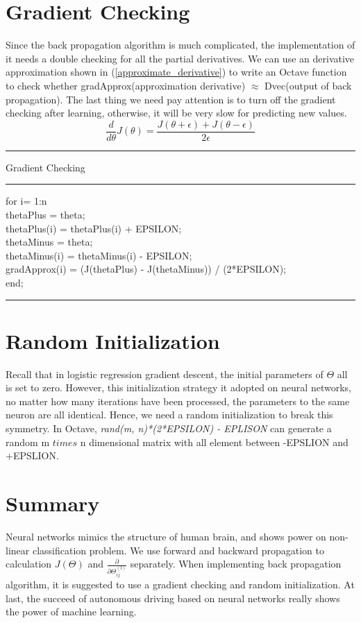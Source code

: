 \documentclass{article}
\begin{document}
\section{Gradient Checking}
Since the back propagation algorithm is much complicated, the implementation of it needs a double checking for all the partial derivatives. We can use an derivative approximation shown in (\ref{approximate_derivative}) to write an Octave function to check whether gradApprox(approximation derivative) $\approx$ Dvec(output of back propagation). The last thing we need pay attention is to turn off the gradient checking after learning, otherwise, it will be very slow for predicting new values.
\begin{equation}\label{approximate_derivative}
\frac{d}{d\theta}J(\theta) = \frac{J(\theta + \epsilon) + J(\theta - \epsilon)}{2 \epsilon}
\end{equation}

\newpage
\smallskip
\hrule
\smallskip
Gradient Checking\\
\smallskip
\hrule
\smallskip
\noindent for i= 1:n\\
\indent thetaPlus = theta;\\
\indent thetaPlus(i) = thetaPlus(i) + EPSILON;\\
\indent thetaMinus = theta;\\
\indent thetaMinus(i) = thetaMinus(i) - EPSILON;\\
\indent gradApprox(i) = (J(thetaPlus) - J(thetaMinus)) / (2*EPSILON);\\
end;\\
\hrule
\medskip

\section{Random Initialization}
Recall that in logistic regression gradient descent, the initial parameters of $\Theta$ all is set to zero. However, this initialization strategy it adopted on neural networks, no matter how many iterations have been processed, the parameters to the same neuron are all identical. Hence, we need a random initialization to break this symmetry. In Octave, \emph{rand(m, n)*(2*EPSILON) - EPLISON} can generate a random m $times$ n dimensional matrix with all element between -EPSLION and +EPSLION.

\section{Summary}
Neural networks mimics the structure of human brain, and shows power on non-linear classification problem. We use forward and backward propagation to calculation $J(\Theta)$ and $\frac{\partial}{\partial \Theta_{ij}^{(l)}}$ separately. When implementing back propagation algorithm, it is suggested to use a gradient checking and random initialization. At last, the succeed of autonomous driving based on neural networks really shows the power of machine learning.
\end{document}
